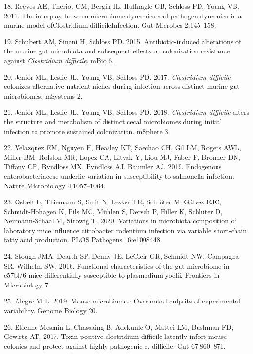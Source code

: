 \documentclass[11pt,]{article}
\begin{document}
\hypertarget{ref-Reeves2011}{}
18. Reeves AE, Theriot CM, Bergin IL, Huffnagle GB, Schloss PD, Young
VB. 2011. The interplay between microbiome dynamics and pathogen
dynamics in a murine model ofClostridium difficileInfection. Gut
Microbes 2:145--158.

\hypertarget{ref-Schubert2015}{}
19. Schubert AM, Sinani H, Schloss PD. 2015. Antibiotic-induced
alterations of the murine gut microbiota and subsequent effects on
colonization resistance against \emph{Clostridium difficile}. mBio 6.

\hypertarget{ref-Jenior2017}{}
20. Jenior ML, Leslie JL, Young VB, Schloss PD. 2017. \emph{Clostridium
difficile} colonizes alternative nutrient niches during infection across
distinct murine gut microbiomes. mSystems 2.

\hypertarget{ref-Jenior2018}{}
21. Jenior ML, Leslie JL, Young VB, Schloss PD. 2018. \emph{Clostridium
difficile} alters the structure and metabolism of distinct cecal
microbiomes during initial infection to promote sustained colonization.
mSphere 3.

\hypertarget{ref-Velazquez2019}{}
22. Velazquez EM, Nguyen H, Heasley KT, Saechao CH, Gil LM, Rogers AWL,
Miller BM, Rolston MR, Lopez CA, Litvak Y, Liou MJ, Faber F, Bronner DN,
Tiffany CR, Byndloss MX, Byndloss AJ, Bäumler AJ. 2019. Endogenous
enterobacteriaceae underlie variation in susceptibility to salmonella
infection. Nature Microbiology 4:1057--1064.

\hypertarget{ref-Osbelt2020}{}
23. Osbelt L, Thiemann S, Smit N, Lesker TR, Schröter M, Gálvez EJC,
Schmidt-Hohagen K, Pils MC, Mühlen S, Dersch P, Hiller K, Schlüter D,
Neumann-Schaal M, Strowig T. 2020. Variations in microbiota composition
of laboratory mice influence citrobacter rodentium infection via
variable short-chain fatty acid production. PLOS Pathogens 16:e1008448.

\hypertarget{ref-Stough2016}{}
24. Stough JMA, Dearth SP, Denny JE, LeCleir GR, Schmidt NW, Campagna
SR, Wilhelm SW. 2016. Functional characteristics of the gut microbiome
in c57bl/6 mice differentially susceptible to plasmodium yoelii.
Frontiers in Microbiology 7.

\hypertarget{ref-Alegre2019}{}
25. Alegre M-L. 2019. Mouse microbiomes: Overlooked culprits of
experimental variability. Genome Biology 20.

\hypertarget{ref-EtienneMesmin2017}{}
26. Etienne-Mesmin L, Chassaing B, Adekunle O, Mattei LM, Bushman FD,
Gewirtz AT. 2017. Toxin-positive clostridium difficile latently infect
mouse colonies and protect against highly pathogenic c. difficile. Gut
67:860--871.
\end{document}
